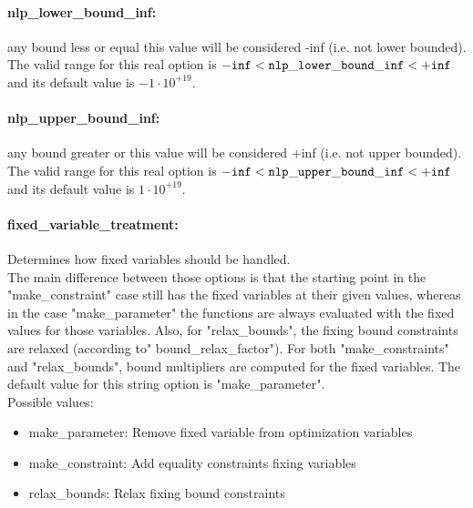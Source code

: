 \paragraph{nlp\_lower\_bound\_inf:}\label{opt:nlp_lower_bound_inf} any bound less or equal this value will be considered -inf (i.e. not lower bounded). \\
 The valid range for this real option is 
${\tt -inf} <  {\tt nlp\_lower\_bound\_inf } <  {\tt +inf}$
and its default value is $-1 \cdot 10^{+19}$.


\paragraph{nlp\_upper\_bound\_inf:}\label{opt:nlp_upper_bound_inf} any bound greater or this value will be considered +inf (i.e. not upper bounded). \\
 The valid range for this real option is 
${\tt -inf} <  {\tt nlp\_upper\_bound\_inf } <  {\tt +inf}$
and its default value is $1 \cdot 10^{+19}$.


\paragraph{fixed\_variable\_treatment:}\label{opt:fixed_variable_treatment} Determines how fixed variables should be handled. \\
 The main difference between those options is that
the starting point in the "make\_constraint" case
still has the fixed variables at their given
values, whereas in the case "make\_parameter" the
functions are always evaluated with the fixed
values for those variables.  Also, for
"relax\_bounds", the fixing bound constraints are
relaxed (according to" bound\_relax\_factor").
For both "make\_constraints" and "relax\_bounds",
bound multipliers are computed for the fixed
variables. The default value for this string option is "make\_parameter".
\\ 
Possible values:
\begin{itemize}
   \item make\_parameter: Remove fixed variable from optimization
variables
   \item make\_constraint: Add equality constraints fixing variables
   \item relax\_bounds: Relax fixing bound constraints
\end{itemize}

